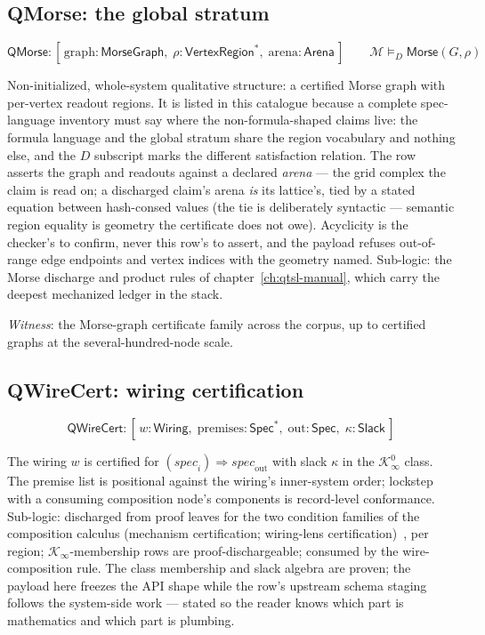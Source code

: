 

\subsection{QMorse: the global stratum}
\label{sec:spec-lang-qmorse}

\[
\mathsf{QMorse} : [\, \mathrm{graph} : \mathsf{MorseGraph},\;
  \rho : \mathsf{VertexRegion}^{*},\;
  \mathrm{arena} : \mathsf{Arena} \,]
\qquad
\mathcal{M} \vDash_D \mathsf{Morse}(G, \rho)
\]

Non-initialized, whole-system qualitative structure: a certified
Morse graph with per-vertex readout regions. It is listed in this
catalogue because a complete spec-language inventory must say where
the non-formula-shaped claims live: the formula language and the
global stratum share the region vocabulary and nothing else, and the
$D$ subscript marks the different satisfaction relation. The row
asserts the graph and readouts against a declared \emph{arena} ---
the grid complex the claim is read on; a discharged claim's arena
\emph{is} its lattice's, tied by a stated equation between
hash-consed values (the tie is deliberately syntactic --- semantic
region equality is geometry the certificate does not owe).
Acyclicity is the checker's to
confirm, never this row's to assert, and the payload refuses
out-of-range edge endpoints and vertex indices with the geometry
named. Sub-logic: the Morse discharge and product rules of
chapter~\ref{ch:qtsl-manual}, which carry the deepest mechanized
ledger in the stack.

\emph{Witness}: the Morse-graph certificate family across the
corpus, up to certified graphs at the several-hundred-node scale.



\subsection{QWireCert: wiring certification}
\label{sec:spec-lang-qwirecert}

\[
\mathsf{QWireCert} : [\, w : \mathsf{Wiring},\;
  \mathrm{premises} : \mathsf{Spec}^{*},\;
  \mathrm{out} : \mathsf{Spec},\;
  \kappa : \mathsf{Slack} \,]
\]

The wiring $w$ is certified for $(\mathit{spec}_i) \Rightarrow
\mathit{spec}_{\mathrm{out}}$ with slack $\kappa$ in the
$\mathcal{K}^0_\infty$ class. The premise list is positional
against the wiring's inner-system order; lockstep with a consuming
composition node's components is record-level conformance. Sub-logic: discharged from proof
leaves for the two condition families of the composition calculus
(mechanism certification; wiring-lens
certification)~\cite{capuccimyers2026}, per region;
$\mathcal{K}_\infty$-membership rows are proof-dischargeable;
consumed by the wire-composition rule. The class membership and slack
algebra are proven; the payload here freezes the API shape while the
row's upstream schema staging follows the system-side work --- stated
so the reader knows which part is mathematics and which part is
plumbing.

